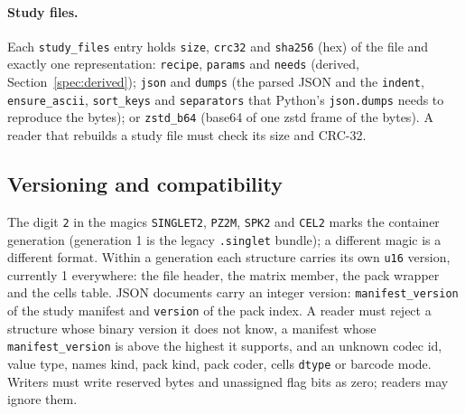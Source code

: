 \paragraph{Study files.}
Each \texttt{study\_files} entry holds \texttt{size}, \texttt{crc32} and \texttt{sha256} (hex) of the file and exactly
one representation: \texttt{recipe}, \texttt{params} and \texttt{needs} (derived, Section~\ref{spec:derived});
\texttt{json} and \texttt{dumps} (the parsed JSON and the \texttt{indent}, \texttt{ensure\_ascii}, \texttt{sort\_keys}
and \texttt{separators} that Python's \texttt{json.dumps} needs to reproduce the bytes); or \texttt{zstd\_b64} (base64
of one zstd frame of the bytes). A reader that rebuilds a study file must check its size and CRC-32.

\subsection{Versioning and compatibility}
\label{spec:versions}
The digit \texttt{2} in the magics \texttt{SINGLET2}, \texttt{PZ2M}, \texttt{SPK2} and \texttt{CEL2} marks the container
generation (generation 1 is the legacy \texttt{.singlet} bundle); a different magic is a different format. Within a
generation each structure carries its own \texttt{u16} version, currently 1 everywhere: the file header, the matrix
member, the pack wrapper and the cells table. JSON documents carry an integer version: \texttt{manifest\_version} of the
study manifest and \texttt{version} of the pack index. A reader must reject a structure whose binary version it does
not know, a manifest whose \texttt{manifest\_version} is above the highest it supports, and an unknown codec id, value
type, names kind, pack kind, pack coder, cells \texttt{dtype} or barcode mode. Writers must write reserved bytes and
unassigned flag bits as zero; readers may ignore them.

